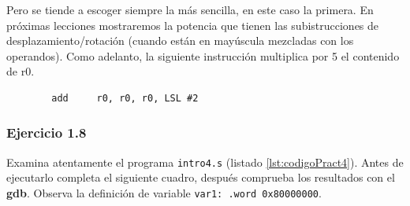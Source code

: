 Pero se tiende a escoger siempre la más sencilla, en este caso la primera. En
próximas lecciones mostraremos la potencia que tienen las subistrucciones de
desplazamiento/rotación (cuando están en mayúscula mezcladas con los operandos).
Como adelanto, la siguiente instrucción multiplica por 5 el contenido de r0.

\begin{lstlisting}
        add     r0, r0, r0, LSL #2
\end{lstlisting}

\subsubsection{Ejercicio 1.8}
Examina atentamente el programa {\tt intro4.s} (listado \ref{lst:codigoPract4}).
Antes de ejecutarlo completa el siguiente cuadro, después comprueba los resultados con
el {\bf gdb}. Observa la definición de variable {\tt var1: .word 0x80000000}.

